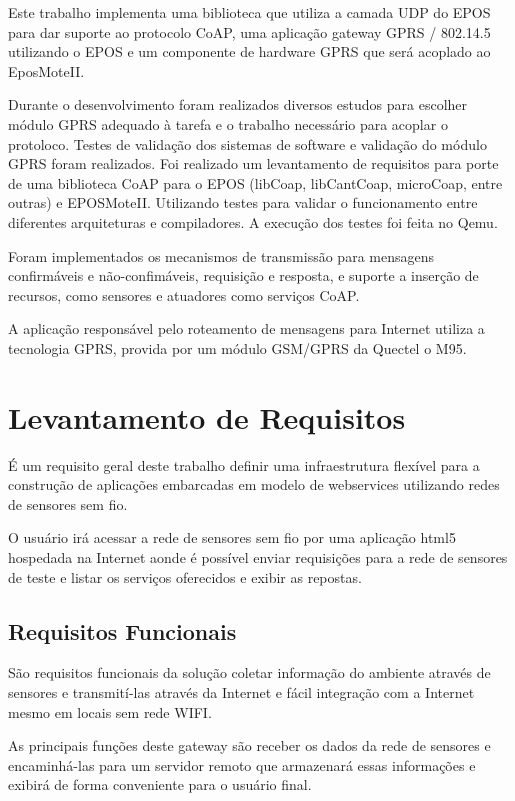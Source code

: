 Este trabalho implementa uma biblioteca que utiliza a camada UDP do EPOS para dar suporte ao protocolo CoAP, uma aplica\c{c}\~ao gateway GPRS / 802.14.5 utilizando o EPOS e um componente de hardware GPRS que ser\'a acoplado ao EposMoteII.

Durante o desenvolvimento foram realizados diversos estudos para escolher m\'odulo GPRS adequado \`a tarefa e o trabalho necess\'ario para acoplar o protoloco. Testes de valida\c{c}\~ao dos sistemas de software e valida\c{c}\~ao do m\'odulo GPRS foram realizados. Foi realizado um levantamento de requisitos para porte de uma biblioteca CoAP para o EPOS (libCoap, libCantCoap, microCoap, entre outras) e EPOSMoteII. Utilizando testes para validar o funcionamento entre diferentes arquiteturas e compiladores. A execu\c{c}\~ao dos testes foi feita no Qemu.

Foram implementados os mecanismos de transmiss\~ao para mensagens confirm\'aveis e n\~ao-confim\'aveis, requisi\c{c}\~ao e resposta, e suporte a inser\c{c}\~ao de recursos, como sensores e atuadores como servi\c{c}os CoAP.

A aplica\c{c}\~ao respons\'avel pelo roteamento de mensagens para Internet utiliza a tecnologia GPRS, provida por um m\'odulo GSM/GPRS da Quectel o M95.

\section{Levantamento de Requisitos}
\'E um requisito geral deste trabalho definir uma infraestrutura flex\'ivel para a constru\c{c}\~ao de aplica\c{c}\~oes embarcadas em modelo de webservices utilizando redes de sensores sem fio.

O usu\'ario ir\'a acessar a rede de sensores sem fio por uma aplica\c{c}\~ao html5 hospedada na Internet aonde \'e poss\'ivel enviar requisi\c{c}\~oes para a rede de sensores de teste e listar os servi\c{c}os oferecidos e exibir as repostas.

\subsection{Requisitos Funcionais}
S\~ao requisitos funcionais da solu\c{c}\~ao coletar informa\c{c}\~ao do ambiente atrav\'es de sensores e transmit\'i-las atrav\'es da Internet e f\'acil integra\c{c}\~ao com a Internet mesmo em locais sem rede WIFI.

As principais fun\c{c}\~oes deste gateway s\~ao receber os dados da rede de sensores e encaminh\'a-las para um servidor remoto que armazenar\'a essas informa\c{c}\~oes e exibir\'a de forma conveniente para o usu\'ario final.

